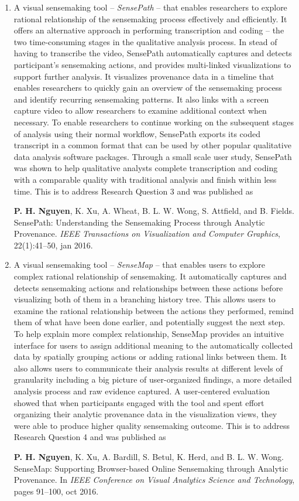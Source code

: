 \begin{enumerate}
	\item A visual sensemaking tool -- \emph{SensePath} -- that enables researchers to explore rational relationship of the sensemaking process effectively and efficiently. It offers an alternative approach in performing transcription and coding -- the two time-consuming stages in the qualitative analysis process. In stead of having to transcribe the video, SensePath automatically captures and detects participant's sensemaking actions, and provides multi-linked visualizations to support further analysis. It visualizes provenance data in a timeline that enables researchers to quickly gain an overview of the sensemaking process and identify recurring sensemaking patterns. It also links with a screen capture video to allow researchers to examine  additional context when necessary. To enable researchers to continue working on the subsequent stages of analysis using their normal workflow, SensePath exports its coded transcript in a common format that can be used by other popular qualitative data analysis software packages. Through a small scale user study, SensePath was shown to help qualitative analysts complete transcription and coding with a comparable quality with traditional analysis and finish within less time. This is to address Research Question 3 and was published as
	
	\qquad\textbf{P. H. Nguyen}, K. Xu, A. Wheat, B. L. W. Wong, S. Attfield, and B. Fields. SensePath: Understanding the Sensemaking Process through Analytic Provenance. \textit{IEEE Transactions on Visualization and Computer Graphics}, 22(1):41--50, jan 2016. 
	
	\item A visual sensemaking tool -- \emph{SenseMap} -- that enables users to explore complex rational relationship of sensemaking. It automatically captures and detects sensemaking actions and relationships between these actions before visualizing both of them in a branching history tree. This allows users to examine the rational relationship between the actions they performed, remind them of what have been done earlier, and potentially suggest the next step. To help explain more complex relationship, SenseMap provides an intuitive interface for users to assign additional meaning to the automatically collected data by spatially grouping actions or adding rational links between them. It also allows users to communicate their analysis results at different levels of granularity including a big picture of user-organized findings, a more detailed analysis process and raw evidence captured. A user-centered evaluation showed that when participants engaged with the tool and spent effort organizing their analytic provenance data in the visualization views, they were able to produce higher quality sensemaking outcome. This is to address Research Question 4 and was published as 

	\qquad\textbf{P. H. Nguyen}, K. Xu, A. Bardill, S. Betul, K. Herd, and B. L. W. Wong. SenseMap: Supporting Browser-based Online Sensemaking through Analytic Provenance. In \textit{IEEE Conference on Visual Analytics Science and Technology}, pages 91--100, oct 2016.
\end{enumerate}

